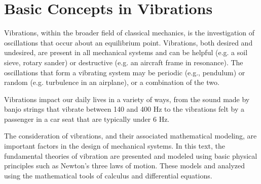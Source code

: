 \documentclass[12pt,letter]{article}
\begin{document}
	
	\setcounter{section}{0}	
	\setcounter{figure}{0}   
	\renewcommand\thefigure{\thesection.\arabic{figure}}
	\setcounter{equation}{0}   
	\renewcommand\theequation{\thesection.\arabic{equation}}

	\section{Basic Concepts in Vibrations}

    Vibrations, within the broader field of classical mechanics, is the investigation of oscillations that occur about an equilibrium point. Vibrations, both desired and undesired, are present in all mechanical systems and can be helpful (e.g. a soil sieve, rotary sander) or destructive (e.g. an aircraft frame in resonance). The oscillations that form a vibrating system may be periodic (e.g., pendulum) or random (e.g. turbulence in an airplane), or a combination of the two. 

    Vibrations impact our daily lives in a variety of ways, from the sound made by banjo strings that vibrate between 140 and 400 Hz to the vibrations felt by a passenger in a car seat that are typically under 6 Hz.
    
    The consideration of vibrations, and their associated mathematical modeling, are important factors in the design of mechanical systems. In this text, the fundamental theories of vibration are presented and modeled using basic physical principles such as Newton's three laws of motion. These models and analyzed using the mathematical tools of calculus and differential equations. 
\end{document}
